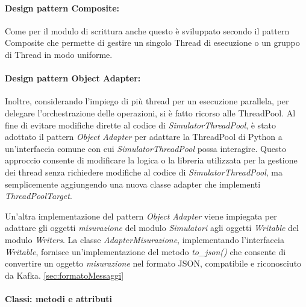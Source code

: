 \paragraph{Design pattern Composite:}
Come per il modulo di scrittura anche questo è sviluppato secondo il pattern Composite che permette di gestire un singolo Thread di esecuzione o un gruppo di Thread in modo uniforme.
\paragraph{Design pattern Object Adapter:}
Inoltre, considerando l'impiego di più thread per un esecuzione parallela, per delegare l'orchestrazione delle operazioni, si è fatto ricorso alle ThreadPool. Al fine di evitare modifiche dirette al codice di \textit{SimulatorThreadPool}, è stato adottato il pattern \textit{Object Adapter} per adattare la ThreadPool di Python a un'interfaccia comune con cui \textit{SimulatorThreadPool} possa interagire. Questo approccio consente di modificare la logica o la libreria utilizzata per la gestione dei thread senza richiedere modifiche al codice di \textit{SimulatorThreadPool}, ma semplicemente aggiungendo una nuova classe adapter che implementi \textit{ThreadPoolTarget}.


Un'altra implementazione del pattern \textit{Object Adapter} viene impiegata per adattare gli oggetti \textit{misurazione} del modulo \textit{Simulatori} agli oggetti \textit{Writable} del modulo \textit{Writers}. La classe \textit{AdapterMisurazione}, implementando l'interfaccia \textit{Writable}, fornisce un'implementazione del metodo \textit{to\_json()} che consente di convertire un oggetto \textit{misurazione} nel formato JSON, compatibile e riconosciuto da Kafka.
\ref*{sec:formatoMessaggi}


\paragraph{Classi: metodi e attributi}

